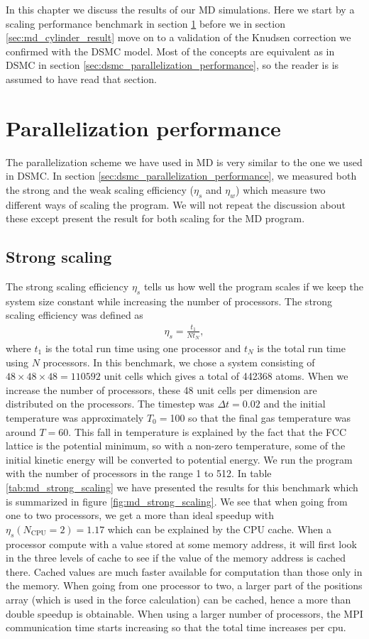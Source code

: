 In this chapter we discuss the results of our MD simulations. Here we start by a scaling performance benchmark in section \ref{sec:md_benchmark} before we in section \ref{sec:md_cylinder_result} move on to a validation of the Knudsen correction we confirmed with the DSMC model. Most of the concepts are equivalent as in DSMC in section \ref{sec:dsmc_parallelization_performance}, so the reader is is assumed to have read that section.

\section{Parallelization performance}
\label{sec:md_benchmark}
The parallelization scheme we have used in MD is very similar to the one we used in DSMC. In section \ref{sec:dsmc_parallelization_performance}, we measured both the strong and the weak scaling efficiency ($\eta_s$ and $\eta_w$) which measure two different ways of scaling the program. We will not repeat the discussion about these except present the result for both scaling for the MD program. 

\subsection{Strong scaling}
The strong scaling efficiency $\eta_s$ tells us how well the program scales if we keep the system size constant while increasing the number of processors. The strong scaling efficiency was defined as
\begin{align}
	\eta_s = \frac{t_1}{Nt_N},
\end{align}
where $t_1$ is the total run time using one processor and $t_N$ is the total run time using $N$ processors. In this benchmark, we chose a system consisting of $48\times48\times48=110592$ unit cells which gives a total of 442368 atoms. When we increase the number of processors, these 48 unit cells per dimension are distributed on the processors. The timestep was $\Delta t = 0.02$ and the initial temperature was approximately $T_0=$\unit{100}{\kelvin} so that the final gas temperature was around $T=$\unit{60}{\kelvin}. This fall in temperature is explained by the fact that the FCC lattice is the potential minimum, so with a non-zero temperature, some of the initial kinetic energy will be converted to potential energy. We run the program with the number of processors in the range 1 to 512. In table \ref{tab:md_strong_scaling} we have presented the results for this benchmark which is summarized in figure \ref{fig:md_strong_scaling}. We see that when going from one to two processors, we get a more than ideal speedup with $\eta_s(N_\text{CPU}=2)=1.17$ which can be explained by the CPU cache. When a processor compute with a value stored at some memory address, it will first look in the three levels of cache to see if the value of the memory address is cached there. Cached values are much faster available for computation than those only in the memory. When going from one processor to two, a larger part of the positions array (which is used in the force calculation) can be cached, hence a more than double speedup is obtainable. When using a larger number of processors, the MPI communication time starts increasing so that the total time increases per cpu. 

